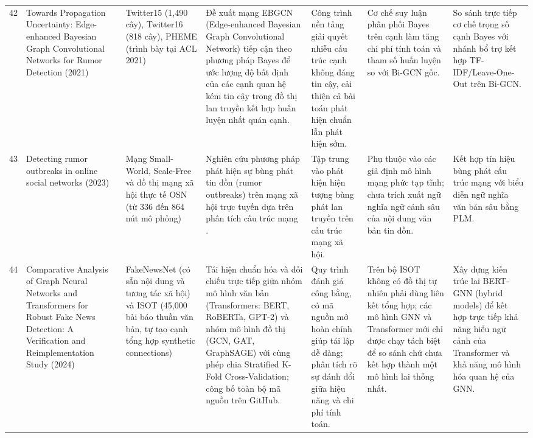 \documentclass[11pt,a4paper]{extreport}
\begin{document}
\begin{landscape}
\begin{longtable}{@{}C{0.6cm}p{3.6cm}p{2.7cm}p{4.8cm}p{3.6cm}p{3.6cm}p{3.6cm}@{}}
42 & Towards Propagation Uncertainty: Edge-enhanced Bayesian Graph Convolutional Networks for Rumor Detection (2021) \cite{wei_towards_2021} & Twitter15 (1,490 cây), Twitter16 (818 cây), PHEME (trình bày tại ACL 2021) & Đề xuất mạng EBGCN (Edge-enhanced Bayesian Graph Convolutional Network) tiếp cận theo phương pháp Bayes để ước lượng độ bất định của các cạnh quan hệ kém tin cậy trong đồ thị lan truyền kết hợp huấn luyện nhất quán cạnh. & Công trình nền tảng giải quyết nhiễu cấu trúc cạnh không đáng tin cậy, cải thiện cả bài toán phát hiện chuẩn lẫn phát hiện sớm. & Cơ chế suy luận phân phối Bayes trên cạnh làm tăng chi phí tính toán và tham số huấn luyện so với Bi-GCN gốc. & So sánh trực tiếp cơ chế trọng số cạnh Bayes với nhánh bổ trợ kết hợp TF-IDF/Leave-One-Out trên Bi-GCN. \\ 

43 & Detecting rumor outbreaks in online social networks (2023) \cite{noauthor_detecting_2023} & Mạng Small-World, Scale-Free và đồ thị mạng xã hội thực tế OSN (từ 336 đến 864 nút mô phỏng) & Nghiên cứu phương pháp phát hiện sự bùng phát tin đồn (rumor outbreaks) trên mạng xã hội trực tuyến dựa trên phân tích cấu trúc mạng \cite{noauthor_detecting_2023}. & Tập trung vào phát hiện hiện tượng bùng phát lan truyền trên cấu trúc mạng xã hội. & Phụ thuộc vào các giả định mô hình mạng phức tạp tĩnh; chưa trích xuất ngữ nghĩa ngữ cảnh sâu của nội dung văn bản tin đồn. & Kết hợp tín hiệu bùng phát cấu trúc mạng với biểu diễn ngữ nghĩa văn bản sâu bằng PLM. \\ 

44 & Comparative Analysis of Graph Neural Networks and Transformers for Robust Fake News Detection: A Verification and Reimplementation Study (2024) \cite{noauthor_comparative_2024} & FakeNewsNet (có sẵn nội dung và tương tác xã hội) và ISOT (45,000 bài báo thuần văn bản, tự tạo cạnh tổng hợp synthetic connections) & Tái hiện chuẩn hóa và đối chiếu trực tiếp giữa nhóm mô hình văn bản (Transformers: BERT, RoBERTa, GPT-2) và nhóm mô hình đồ thị (GCN, GAT, GraphSAGE) với cùng phép chia Stratified K-Fold Cross-Validation; công bố toàn bộ mã nguồn trên GitHub. & Quy trình đánh giá công bằng, có mã nguồn mở hoàn chỉnh giúp tái lập dễ dàng; phân tích rõ sự đánh đổi giữa hiệu năng và chi phí tính toán. & Trên bộ ISOT không có đồ thị tự nhiên phải dùng liên kết tổng hợp; các mô hình GNN và Transformer mới chỉ được chạy tách biệt để so sánh chứ chưa kết hợp thành một mô hình lai thống nhất. & Xây dựng kiến trúc lai BERT-GNN (hybrid models) để kết hợp trực tiếp khả năng hiểu ngữ cảnh của Transformer và khả năng mô hình hóa quan hệ của GNN. \\ 


\end{longtable}
\end{landscape}
\end{document}
